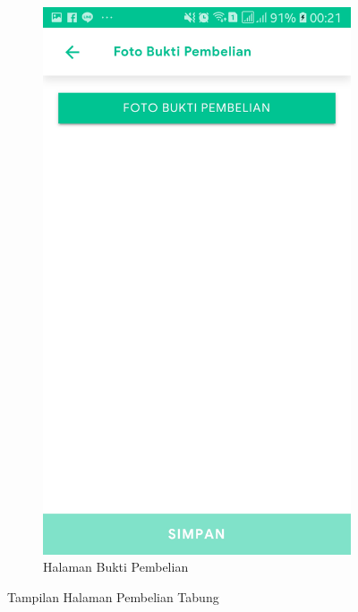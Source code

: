 \begin{figure}[H]
\begin{subfigure}[b]{0.43\linewidth}
		\includegraphics [width = \linewidth]{gambar/android/bukti-pembelian}
		\caption{Halaman Bukti Pembelian}
	\end{subfigure}
	
	\caption{Tampilan Halaman Pembelian Tabung}
	\label{tampilanPembelianPangkalan}
	\end{figure}

